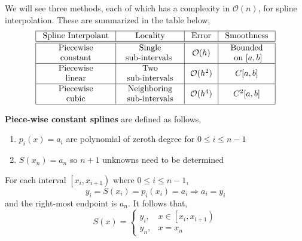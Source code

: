 \noindent We will see three methods, each of which has a complexity in $\mathcal{O}(n)$, for spline interpolation. These are summarized in the table below,
\[
\begin{array}{|c|c|c|c|}
\hline \text { Spline Interpolant } & \text { Locality } & \text { Error } & \text { Smoothness }\\
\hline \hline \begin{array}{c}
\text { Piecewise } \\
\text { constant }
\end{array} & \begin{array}{c}
\text { Single } \\
\text {sub-intervals }
\end{array} & \mathcal{O}(h) & \begin{array}{c}
\text { Bounded } \\
\text { on } [a, b]  \\
\end{array} \\
\hline \begin{array}{c}
\text { Piecewise } \\
\text { linear }
\end{array} & \begin{array}{c}
\text { Two } \\
\text { sub-intervals }
\end{array} & \mathcal{O}(h^2) & C[a, b] \\
\hline \begin{array}{c}
\text { Piecewise } \\
\text { cubic }
\end{array} & \begin{array}{c}
\text { Neighboring } \\
\text { sub-intervals }
\end{array} & \mathcal{O}(h^4) & C^2[a, b] \\
\hline
\end{array}
\]

\LineBreak 

\noindent \textbf{Piece-wise constant splines} are defined as follows,
\begin{enumerate}
    \item $p_i(x) = a_i$ are polynomial of zeroth degree for $0 \leq i \leq n - 1$
    \item $S(x_n) = a_n$ so $n + 1$ unknowns need to be determined
\end{enumerate}
For each interval $\left[x_i, x_{i+1}\right)$ where $0 \leq i \leq n - 1$,
\[y_i=S\left(x_i\right)=p_i\left(x_i\right)=a_i \Rightarrow a_i=y_i\]
and the right-most endpoint is $a_n$. It follows that,
\[
S(x)= \begin{cases}y_i, & x \in\left[x_i, x_{i+1}\right) \\ y_n, & x=x_n\end{cases}
\]

